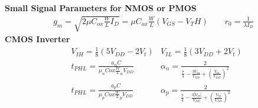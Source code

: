 \documentclass[12pt,letterpaper]{article} \usepackage{amsmath} \usepackage{graphicx} \usepackage[margin=1in]{geometry} \usepackage{longtable}  \usepackage{amssymb}
\begin{document}
\textbf{Small Signal Parameters for NMOS or PMOS}
	\begin{align*}
		g_m = \sqrt{2\mu C_{ox} \frac{W}{L}I_D} = \mu C_{ox} \frac{W}{L} (V_{GS} - V_TH) \qquad r_0 = \frac{1}{\lambda I_D}
	\end{align*}
\textbf{CMOS Inverter}
	\begin{align*}
		&V_{IH} = \frac{1}{8} (5V_{DD} - 2V_t)  &V_{IL} = \frac{1}{8} (3V_{DD} + 2V_t)		\\
		&t_{PHL} = \frac{a_n C}{\mu_n C{ox}\frac{W}{L}_n V_{DD}}& \alpha_n = \frac{2}{\frac{7}{4}-\frac{3V_{tn}}{V_{DD}}+\left(\frac{V_{tn}}{V_{DD}}\right)^2}\\
		&t_{PHL} = \frac{a_p C}{\mu_p C{ox}\frac{W}{L}_p V_{DD}}& \alpha_p = \frac{2}{\frac{7}{4}-\frac{3|V_{tp}|}{V_{DD}}+\left(\frac{V_{tp}}{V_{DD}}\right)^2}
	\end{align*}
	
	
	
	
	
\end{document}
